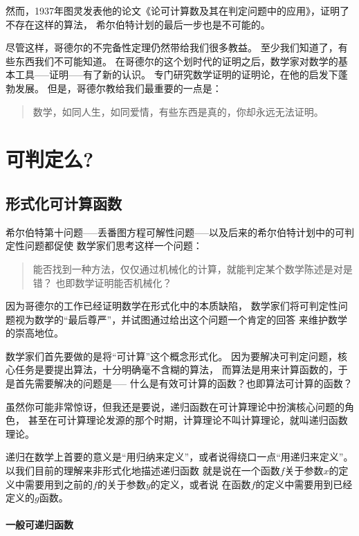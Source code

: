 \documentclass[12pt,a4paper]{ctexrep}
\theoremstyle{definition}
\begin{document}
然而，1937年图灵发表他的论文《论可计算数及其在判定问题中的应用》，证明了不存在这样的算法，
希尔伯特计划的最后一步也是不可能的。

尽管这样，哥德尔的不完备性定理仍然带给我们很多教益。
至少我们知道了，有些东西我们不可能知道。
在哥德尔的这个划时代的证明之后，数学家对数学的基本工具-----证明-----有了新的认识。
专门研究数学证明的证明论，在他的启发下蓬勃发展。
但是，哥德尔教给我们最重要的一点是\cite{dream}：

\begin{quote}
数学，如同人生，如同爱情，有些东西是真的，你却永远无法证明。
\end{quote}

\section{可判定么?}

\subsection{形式化可计算函数}

希尔伯特第十问题-----丢番图方程可解性问题-----以及后来的希尔伯特计划中的可判定性问题都促使
数学家们思考这样一个问题：

\begin{quote}
能否找到一种方法，仅仅通过机械化的计算，就能判定某个数学陈述是对是错？
也即数学证明能否机械化？
\end{quote}

因为哥德尔的工作已经证明数学在形式化中的本质缺陷，
数学家们将可判定性问题视为数学的“最后尊严”，并试图通过给出这个问题一个肯定的回答
来维护数学的崇高地位。

数学家们首先要做的是将“可计算”这个概念形式化。
因为要解决可判定问题，核心任务是要提出算法，十分明确毫不含糊的算法，
而算法是用来计算函数的，于是首先需要解决的问题是-----
什么是有效可计算的函数？也即算法可计算的函数？

虽然你可能非常惊讶，但我还是要说，递归函数在可计算理论中扮演核心问题的角色，
甚至在可计算理论发源的那个时期，计算理论不叫计算理论，就叫递归函数理论。

递归在数学上首要的意义是“用归纳来定义”，或者说得绕口一点“用递归来定义”。
以我们目前的理解来非形式化地描述递归函数
就是说在一个函数$f$关于参数$x$的定义中需要用到之前的$f$的关于参数$y$的定义，或者说
在函数$f$的定义中需要用到已经定义的$g$函数。

\paragraph{一般可递归函数}
\end{document}

